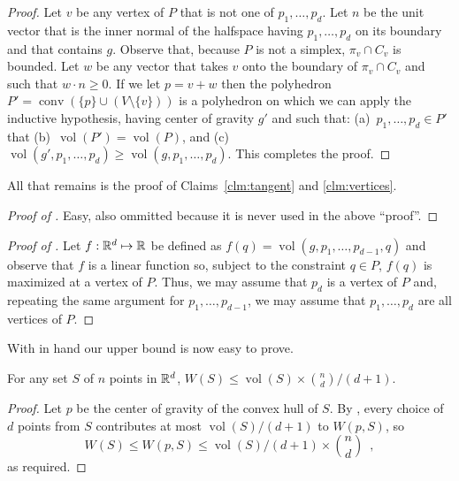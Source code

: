 \documentclass[lotsofwhite]{patmorin}
\DeclareMathOperator{\vol}{vol}
\DeclareMathOperator{\conv}{conv}
\begin{document}
\begin{proof}
Let $v$ be any vertex of $P$ that is not one of $p_1,\ldots,p_d$.  Let
$n$ be the unit vector that is the inner normal of the halfspace
having $p_1,\ldots,p_d$ on its boundary and that contains $g$.
Observe that, because $P$ is not a simplex, $\pi_v\cap C_v$ is
bounded.  Let $w$ be any vector that takes $v$ onto the boundary of
$\pi_v\cap C_v$ and such that $w\cdot n \ge 0$.  If we let $p=v+w$
then the polyhedron $P'=\conv(\{p\}\cup (V\setminus\{v\}))$ is a
polyhedron on which we can apply the inductive hypothesis, having
center of gravity $g'$ and such that: (a)~$p_1,\ldots,p_d\in P'$ that
(b)~$\vol(P')=\vol(P)$, and (c)~$\vol(g',p_1,\ldots,p_d)\ge
\vol(g,p_1,\ldots,p_d)$.  This completes the proof.
\end{proof}

All that remains is the proof of Claims~\ref{clm:tangent} and
\ref{clm:vertices}.

\begin{proof}[Proof of ]
Easy, also ommitted because it is never used in the above ``proof''.
\end{proof}

\begin{proof}[Proof of ]
Let
$f:\mathbb{R}^d\mapsto \mathbb{R}$ be defined as $f(q)=\vol(g,p_1,\ldots,p_{d-1},q)$
and observe that $f$ is a linear function so, subject to the
constraint $q\in P$, $f(q)$ is maximized at a vertex of $P$.  Thus, we
may assume that $p_d$ is a vertex of $P$ and, repeating the same
argument for $p_1,\ldots,p_{d-1}$, we may assume that
$p_1,\ldots,p_{d}$ are all vertices of $P$.
\end{proof}


With  in hand our upper bound is now easy to prove.

\begin{thm}
For any set $S$ of $n$ points in $\mathbb{R}^d$, $W(S) \le \vol(S)\times {n \choose
d}/(d+1)$.
\end{thm}

\begin{proof}
Let $p$ be the center of gravity of the convex hull of $S$.  By
,
every choice of $d$ points from $S$ contributes at most
$\vol(S)/(d+1)$ to $W(p,S)$, so
\[
    W(S) \le W(p,S) \le \vol(S)/(d+1)\times {n\choose d} \enspace ,
\]
as required.
\end{proof}
\end{document}
